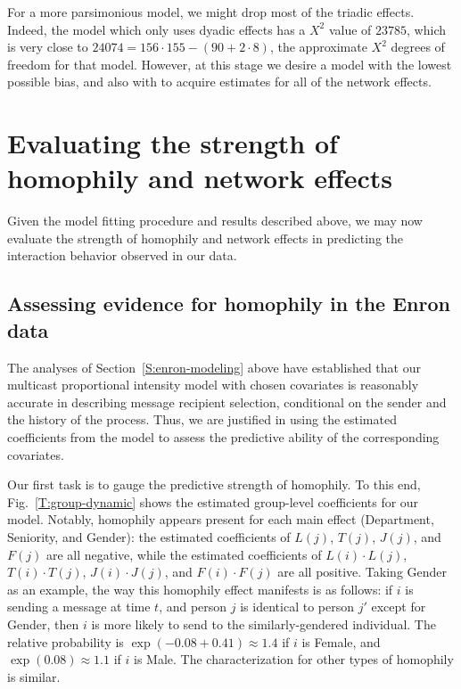 \documentclass[final]{statsoc}
\begin{document}
For a more parsimonious model, we might drop most of the triadic effects.
Indeed, the model which only uses dyadic effects has a $X^2$ value of $23785$,
which is very close to $24074 = 156 \cdot 155 - (90 + 2 \cdot 8)$, the
approximate $X^2$ degrees of freedom for that model.  However, at this stage
we desire a model with the lowest possible bias, and also with to acquire estimates for all
of the network effects.

\section{Evaluating the strength of homophily and network effects}\label{S:strength-of-effects}

Given the model fitting procedure and results described above, we may now evaluate the strength of homophily and network effects in predicting the interaction behavior observed in our data.

\subsection{Assessing evidence for homophily in the Enron data}\label{S:enron-homophily}

The analyses of Section~\ref{S:enron-modeling} above have established that our multicast proportional intensity model with chosen covariates is reasonably accurate in describing
message recipient selection, conditional on the sender and the history of the
process.  Thus, we are justified in using the estimated coefficients from the
model to assess the predictive ability of the corresponding covariates.

Our first task is to gauge the predictive strength of homophily.  To this end,
Fig.~\ref{T:group-dynamic} shows the estimated group-level coefficients for
our model.  Notably, homophily appears present for each
main effect (Department, Seniority, and Gender): the estimated coefficients of
$L(j)$, $T(j)$, $J(j)$, and $F(j)$ are all negative, while the estimated
coefficients of $L(i) \cdot L(j)$, $T(i) \cdot T(j)$, $J(i) \cdot J(j)$, and
$F(i) \cdot F(j)$ are all positive.  Taking Gender as an example, the way this homophily
effect manifests is as follows: if $i$ is sending a message at time $t$, and person $j$ is
identical to person $j'$ except for Gender, then $i$ is more likely to send to
the similarly-gendered individual.  The relative probability is $\exp(-0.08 +
0.41) \approx 1.4$ if $i$ is Female, and $\exp(0.08) \approx 1.1$ if $i$ is
Male.  The characterization for other types of homophily is similar.
\end{document}
